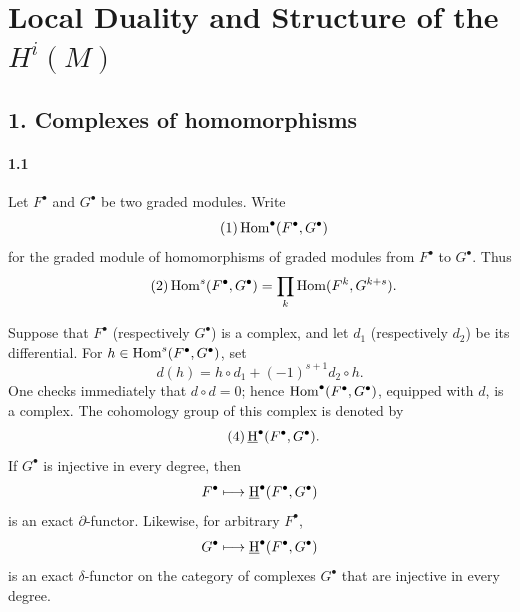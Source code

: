 \makeatletter
\providecommand{\sgareaderlabel}[2]{%
  \begingroup
  \def\@currentlabel{#2}%
  \phantomsection\label{#1}%
  \endgroup}
\makeatother

\chapter{\texorpdfstring{Local Duality and Structure of the $H^i(M)$}{Local Duality and Structure of the H\textasciicircum i(M)}}
\label{V}

\section*{1. Complexes of homomorphisms}
\sgareaderlabel{V.1}{1}

\subsubsection*{1.1}
\sgareaderlabel{V.1.1}{1.1}

Let $F^{\bullet}$ and $G^{\bullet}$ be two graded modules. Write
\begin{equation}\tag{1}\label{eq:V.1}
  \operatorname{Hom}^{\bullet}(F^{\bullet},G^{\bullet})
\end{equation}
for the graded module of homomorphisms of graded modules from $F^{\bullet}$
to $G^{\bullet}$. Thus
\begin{equation}\tag{2}\label{eq:V.2}
  \operatorname{Hom}^{s}(F^{\bullet},G^{\bullet})
    =\prod_k \operatorname{Hom}(F^k,G^{k+s}).
\end{equation}

Suppose that $F^{\bullet}$ (respectively $G^{\bullet}$) is a complex, and let
$d_1$ (respectively $d_2$) be its differential. For
$h\in\operatorname{Hom}^s(F^{\bullet},G^{\bullet})$, set
\begin{equation}\tag{3}\label{eq:V.3}
  d(h)=h\circ d_1+(-1)^{s+1}d_2\circ h.
\end{equation}
One checks immediately that $d\circ d=0$; hence
$\operatorname{Hom}^{\bullet}(F^{\bullet},G^{\bullet})$, equipped with $d$, is a complex.
The cohomology group of this complex is denoted by
\begin{equation}\tag{4}\label{eq:V.4}
  \mathop{\underline{\mathrm H}}\nolimits^{\bullet}(F^{\bullet},G^{\bullet}).
\end{equation}
If $G^{\bullet}$ is injective in every degree, then
\[
  F^{\bullet}\longmapsto
  \mathop{\underline{\mathrm H}}\nolimits^{\bullet}(F^{\bullet},G^{\bullet})
\]
is an exact $\partial$-functor. Likewise, for arbitrary $F^{\bullet}$,
\[
  G^{\bullet}\longmapsto
  \mathop{\underline{\mathrm H}}\nolimits^{\bullet}(F^{\bullet},G^{\bullet})
\]
is an exact $\delta$-functor on the category of complexes $G^{\bullet}$ that
are injective in every degree.

